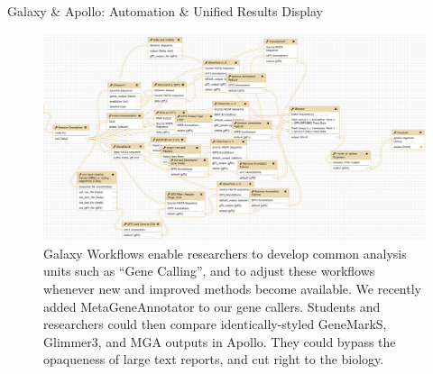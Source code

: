 \documentclass[final,t]{beamer}
\begin{document}
\begin{frame}[fragile]
\begin{columns}[t]
\begin{column}{.60\linewidth}
\begin{block}{Galaxy \& Apollo: Automation \& Unified Results Display}
                \begin{figure}
                    \includegraphics[width=\textwidth]{./media/workflow.png}\vspace{1ex}
                    \caption{Galaxy Workflows enable researchers to develop
                    common analysis units such as ``Gene Calling'', and to
                    adjust these workflows whenever new and improved methods
                    become available. We recently added MetaGeneAnnotator to our
                    gene callers. Students and researchers could then
                    compare identically-styled GeneMarkS, Glimmer3, and MGA
                    outputs in Apollo. They could bypass the opaqueness of
                    large text reports, and cut right to the biology.}
                    \vspace{0.097cm}
                \end{figure}
            \end{block}
        \end{column}
  \end{columns}
\end{frame}
\end{document}
